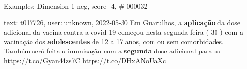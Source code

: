 \begin{frame}{Examples: Dimension 1 neg, score -4, \# 000032}
\footnotesize
\begin{alertblock}{text: t017726, user: unknown, 2022-05-30}
Em Guarulhos, a \textbf{aplicação} da dose adicional da vacina contra a 
covid-19 começou nesta segunda-feira ( 30 ) com a vacinação dos 
\textbf{adolescentes} de 12 a 17 anos, com ou sem comorbidades. Também será 
feita a imunização com a \textbf{segunda} dose adicional para os 
https://t.co/Gyan44zs7C https://t.co/DHxANoUaXc 
\end{alertblock}
\end{frame}
